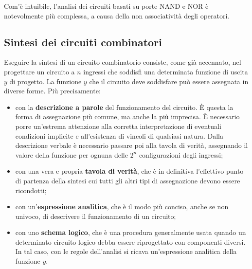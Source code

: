 \documentclass[a4paper]{extarticle}
\begin{document}
\noindent
Com'è intuibile, l’analisi dei circuiti basati su porte NAND e NOR è notevolmente più complessa, a causa della non associatività degli operatori.

\vspace{1em}
\subsection{Sintesi dei circuiti combinatori}
Eseguire la sintesi di un circuito combinatorio consiste, come già accennato, nel progettare un circuito a \(n\) ingressi che soddisfi una determinata funzione di uscita \(y\) di progetto. La funzione \(y\) che il circuito deve soddisfare può essere assegnata in diverse forme. Più precisamente:

\begin{itemize}
    \item con la \textbf{descrizione a parole} del funzionamento del circuito. È questa la forma di assegnazione più comune, ma anche la più imprecisa. È necessario porre un’estrema attenzione alla corretta interpretazione di eventuali condizioni implicite e all’esistenza di vincoli di qualsiasi natura. Dalla descrizione verbale è necessario passare poi alla tavola di verità, assegnando il valore della funzione per ognuna delle \(2^n\) configurazioni degli ingressi;

    \item con una vera e propria \textbf{tavola di verità}, che è in definitiva l’effettivo punto di partenza della sintesi cui tutti gli altri tipi di assegnazione devono essere ricondotti;

    \item con un’\textbf{espressione analitica}, che è il modo più conciso, anche se non univoco, di descrivere il funzionamento di un circuito;

    \item con uno \textbf{schema logico}, che è una procedura generalmente usata quando un determinato circuito logico debba essere riprogettato con componenti diversi. In tal caso, con le regole dell’analisi si ricava un’espressione analitica della funzione $y$.
\end{itemize}
\end{document}
